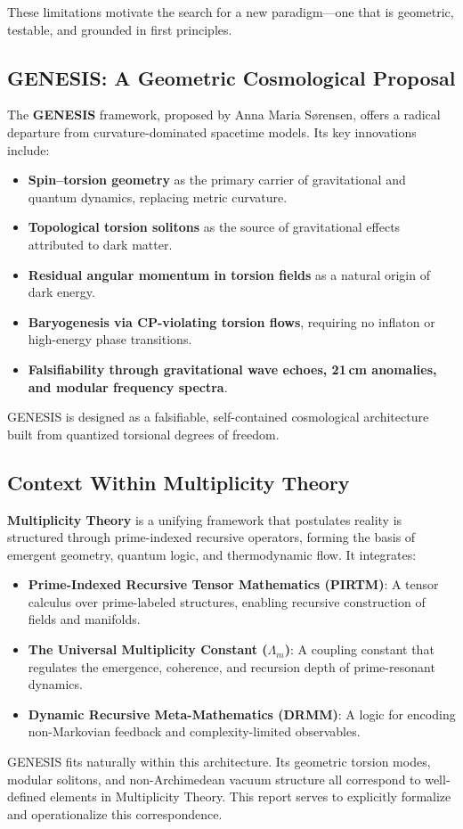 \documentclass{article}
\theoremstyle{plain}
\begin{document}
These limitations motivate the search for a new paradigm—one that is geometric, testable, and grounded in first principles.

\subsection{GENESIS: A Geometric Cosmological Proposal}

The \textbf{GENESIS} framework, proposed by Anna Maria Sørensen, offers a radical departure from curvature-dominated spacetime models. Its key innovations include:
\begin{itemize}
    \item \textbf{Spin–torsion geometry} as the primary carrier of gravitational and quantum dynamics, replacing metric curvature.
    \item \textbf{Topological torsion solitons} as the source of gravitational effects attributed to dark matter.
    \item \textbf{Residual angular momentum in torsion fields} as a natural origin of dark energy.
    \item \textbf{Baryogenesis via CP-violating torsion flows}, requiring no inflaton or high-energy phase transitions.
    \item \textbf{Falsifiability through gravitational wave echoes, 21 cm anomalies, and modular frequency spectra}.
\end{itemize}
GENESIS is designed as a falsifiable, self-contained cosmological architecture built from quantized torsional degrees of freedom.

\subsection{Context Within Multiplicity Theory}

\textbf{Multiplicity Theory} is a unifying framework that postulates reality is structured through prime-indexed recursive operators, forming the basis of emergent geometry, quantum logic, and thermodynamic flow. It integrates:
\begin{itemize}
    \item \textbf{Prime-Indexed Recursive Tensor Mathematics (PIRTM)}: A tensor calculus over prime-labeled structures, enabling recursive construction of fields and manifolds.
    \item \textbf{The Universal Multiplicity Constant ($\Lambda_m$)}: A coupling constant that regulates the emergence, coherence, and recursion depth of prime-resonant dynamics.
    \item \textbf{Dynamic Recursive Meta-Mathematics (DRMM)}: A logic for encoding non-Markovian feedback and complexity-limited observables.
\end{itemize}
GENESIS fits naturally within this architecture. Its geometric torsion modes, modular solitons, and non-Archimedean vacuum structure all correspond to well-defined elements in Multiplicity Theory. This report serves to explicitly formalize and operationalize this correspondence.
\end{document}
